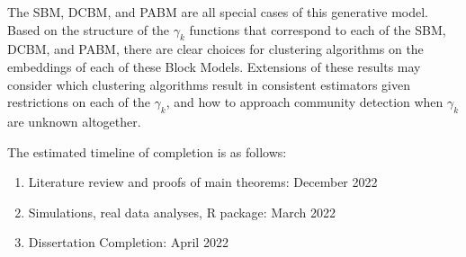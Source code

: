\documentclass[
  11pt,
]{article}
\begin{document}
The SBM, DCBM, and PABM are all special cases of this generative model.
Based on the structure of the \(\gamma_k\) functions that correspond to
each of the SBM, DCBM, and PABM, there are clear choices for clustering
algorithms on the embeddings of each of these Block Models. Extensions
of these results may consider which clustering algorithms result in
consistent estimators given restrictions on each of the \(\gamma_k\),
and how to approach community detection when \(\gamma_k\) are unknown
altogether.

The estimated timeline of completion is as follows:

\begin{enumerate}
\def\labelenumi{\arabic{enumi}.}
\item
  Literature review and proofs of main theorems: December 2022
\item
  Simulations, real data analyses, R package: March 2022
\item
  Dissertation Completion: April 2022
\end{enumerate}

  
\end{document}
